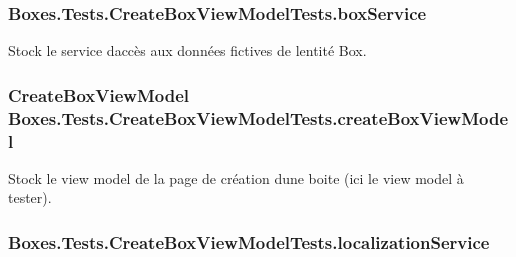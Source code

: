 \subsubsection[{\texorpdfstring{box\+Service}{boxService}}]{ Boxes.\+Tests.\+Create\+Box\+View\+Model\+Tests.\+box\+Service\hspace{0.3cm}{\ttfamily [private]}}\hypertarget{class_boxes_1_1_tests_1_1_create_box_view_model_tests_a3574fac430ae1fafdc6462748df828f8}{}\label{class_boxes_1_1_tests_1_1_create_box_view_model_tests_a3574fac430ae1fafdc6462748df828f8}


Stock le service d\textquotesingle{}accès aux données fictives de l\textquotesingle{}entité Box. 

\subsubsection[{\texorpdfstring{create\+Box\+View\+Model}{createBoxViewModel}}]{\setlength{\rightskip}{0pt plus 5cm}Create\+Box\+View\+Model Boxes.\+Tests.\+Create\+Box\+View\+Model\+Tests.\+create\+Box\+View\+Model\hspace{0.3cm}{\ttfamily [private]}}\hypertarget{class_boxes_1_1_tests_1_1_create_box_view_model_tests_aca1f0f5d93687b6dec26894d54ff2b2d}{}\label{class_boxes_1_1_tests_1_1_create_box_view_model_tests_aca1f0f5d93687b6dec26894d54ff2b2d}


Stock le view model de la page de création d\textquotesingle{}une boite (ici le view model à tester). 

\subsubsection[{\texorpdfstring{localization\+Service}{localizationService}}]{ Boxes.\+Tests.\+Create\+Box\+View\+Model\+Tests.\+localization\+Service\hspace{0.3cm}{\ttfamily [private]}}\hypertarget{class_boxes_1_1_tests_1_1_create_box_view_model_tests_aaefad9e2f283139c6df197b6a9b6488d}{}\label{class_boxes_1_1_tests_1_1_create_box_view_model_tests_aaefad9e2f283139c6df197b6a9b6488d}


